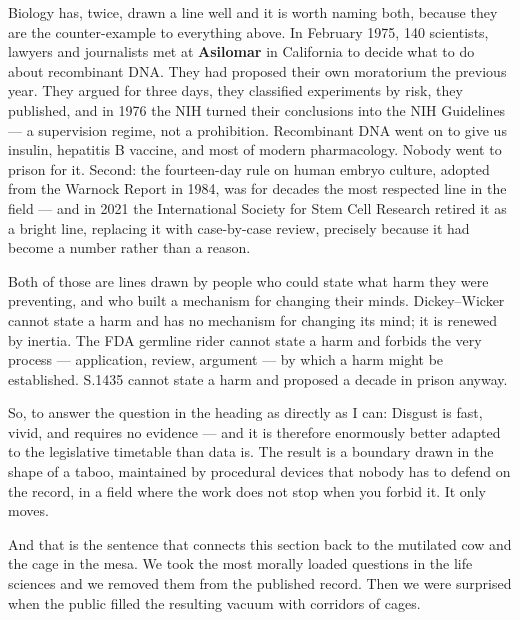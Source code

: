 Biology has, twice, drawn a line well and it is worth naming both, because they are the
counter-example to everything above. In February 1975, 140 scientists, lawyers and journalists met
at \textbf{Asilomar} in California to decide what to do about recombinant DNA. They had proposed
their own moratorium the previous year. They argued for three days, they classified experiments by
risk, they published, and in 1976 the NIH turned their conclusions into the NIH Guidelines --- a
supervision regime, not a prohibition. Recombinant DNA went on to give us insulin, hepatitis B
vaccine, and most of modern pharmacology. Nobody went to prison for it. Second: the fourteen-day
rule on human embryo culture, adopted from the Warnock Report in 1984, was for decades the most
respected line in the field --- and in 2021 the International Society for Stem Cell Research
retired it as a bright line, replacing it with case-by-case review, precisely because it had become
a number rather than a reason.

Both of those are lines drawn by people who could state what harm they were preventing, and who
built a mechanism for changing their minds. Dickey--Wicker cannot state a harm and has no mechanism
for changing its mind; it is renewed by inertia. The FDA germline rider cannot state a harm and
forbids the very process --- application, review, argument --- by which a harm might be
established. S.1435 cannot state a harm and proposed a decade in prison anyway.

So, to answer the question in the heading as directly as I can: 
Disgust is fast, vivid, and requires no evidence --- and it is therefore enormously better adapted
to the legislative timetable than data is. The result is a boundary drawn in the shape of a taboo,
maintained by procedural devices that nobody has to defend on the record, in a field where the
work does not stop when you forbid it. It only moves.

And that is the sentence that connects this section back to the mutilated cow and the cage in the
mesa.  We took the most morally loaded
questions in the life sciences and we removed them from the published record. Then we were
surprised when the public filled the resulting vacuum with corridors of cages.

